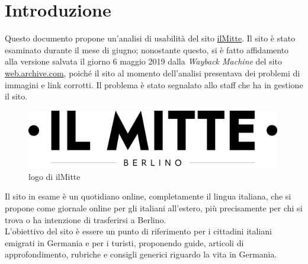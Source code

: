 \newpage
\section{Introduzione}
Questo documento propone un'analisi di usabilità del sito \href{https://ilmitte.com}{ilMitte}. Il sito è stato esaminato durante il mese di giugno; nonostante questo, si è fatto affidamento alla versione salvata il giorno 6 maggio 2019 dalla \textit{Wayback Machine} del sito \href{https://web.archive.org/web/}{web.archive.com}, poiché il sito al momento dell'analisi presentava dei problemi di immagini e link corrotti. Il problema è stato segnalato allo staff che ha in gestione il sito.

\vspace{30pt}
\begin{figure}[htbp]
\begin{center}
\includegraphics[width=30em]{img/logo}
\caption{logo di ilMitte}
\end{center}
\end{figure}
\vspace{30pt}

Il sito in esame è un quotidiano online, completamente il lingua italiana, che si propone come giornale online per gli italiani all'estero, più precisamente per chi si trova o ha intenzione di trasferirsi a Berlino.\\
L'obiettivo del sito è essere un punto di riferimento per i cittadini italiani emigrati in Germania e per i turisti, proponendo guide, articoli di approfondimento, rubriche e consigli generici riguardo la vita in Germania.